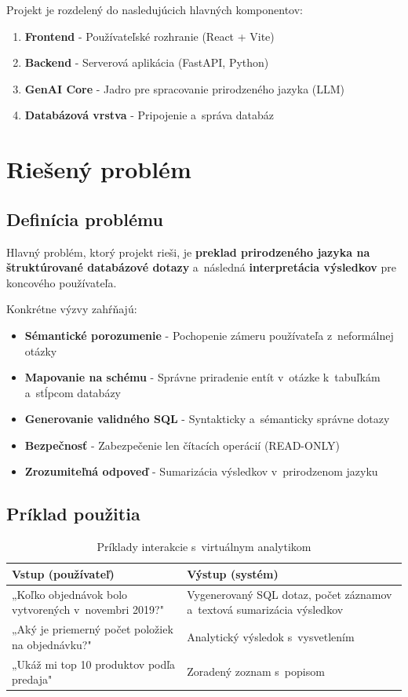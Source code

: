 \documentclass[a4paper, 12pt]{article}
\begin{document}
Projekt je rozdelený do nasledujúcich hlavných komponentov:

\begin{enumerate}
    \item \textbf{Frontend} - Používateľské rozhranie (React + Vite)
    \item \textbf{Backend} - Serverová aplikácia (FastAPI, Python)
    \item \textbf{GenAI Core} - Jadro pre spracovanie prirodzeného jazyka (LLM)
    \item \textbf{Databázová vrstva} - Pripojenie a~správa databáz
\end{enumerate}

\clearpage

\section{Riešený problém}

\subsection{Definícia problému}

Hlavný problém, ktorý projekt rieši, je \textbf{preklad prirodzeného jazyka na štruktúrované databázové dotazy} a~následná \textbf{interpretácia výsledkov} pre koncového používateľa.

Konkrétne výzvy zahŕňajú:
\begin{itemize}
    \item \textbf{Sémantické porozumenie} - Pochopenie zámeru používateľa z~neformálnej otázky
    \item \textbf{Mapovanie na schému} - Správne priradenie entít v~otázke k~tabuľkám a~stĺpcom databázy
    \item \textbf{Generovanie validného SQL} - Syntakticky a~sémanticky správne dotazy
    \item \textbf{Bezpečnosť} - Zabezpečenie len čítacích operácií (READ-ONLY)
    \item \textbf{Zrozumiteľná odpoveď} - Sumarizácia výsledkov v~prirodzenom jazyku
\end{itemize}

\subsection{Príklad použitia}

\begin{table}[H]
\centering
\begin{tabular}{p{6cm}p{8cm}}
\toprule
\textbf{Vstup (používateľ)} & \textbf{Výstup (systém)} \\
\midrule
„Koľko objednávok bolo vytvorených v~novembri 2019?" & Vygenerovaný SQL dotaz, počet záznamov a~textová sumarizácia výsledkov \\
\midrule
„Aký je priemerný počet položiek na objednávku?" & Analytický výsledok s~vysvetlením \\
\midrule
„Ukáž mi top 10 produktov podľa predaja" & Zoradený zoznam s~popisom \\
\bottomrule
\end{tabular}
\caption{Príklady interakcie s~virtuálnym analytikom}
\end{table}
\end{document}
